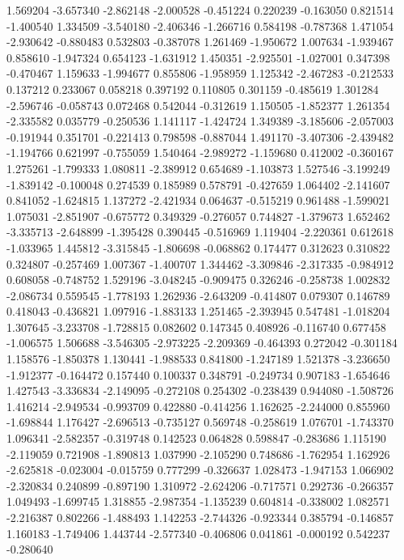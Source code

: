 1.569204
-3.657340
-2.862148
-2.000528
-0.451224
0.220239
-0.163050
0.821514
-1.400540
1.334509
-3.540180
-2.406346
-1.266716
0.584198
-0.787368
1.471054
-2.930642
-0.880483
0.532803
-0.387078
1.261469
-1.950672
1.007634
-1.939467
0.858610
-1.947324
0.654123
-1.631912
1.450351
-2.925501
-1.027001
0.347398
-0.470467
1.159633
-1.994677
0.855806
-1.958959
1.125342
-2.467283
-0.212533
0.137212
0.233067
0.058218
0.397192
0.110805
0.301159
-0.485619
1.301284
-2.596746
-0.058743
0.072468
0.542044
-0.312619
1.150505
-1.852377
1.261354
-2.335582
0.035779
-0.250536
1.141117
-1.424724
1.349389
-3.185606
-2.057003
-0.191944
0.351701
-0.221413
0.798598
-0.887044
1.491170
-3.407306
-2.439482
-1.194766
0.621997
-0.755059
1.540464
-2.989272
-1.159680
0.412002
-0.360167
1.275261
-1.799333
1.080811
-2.389912
0.654689
-1.103873
1.527546
-3.199249
-1.839142
-0.100048
0.274539
0.185989
0.578791
-0.427659
1.064402
-2.141607
0.841052
-1.624815
1.137272
-2.421934
0.064637
-0.515219
0.961488
-1.599021
1.075031
-2.851907
-0.675772
0.349329
-0.276057
0.744827
-1.379673
1.652462
-3.335713
-2.648899
-1.395428
0.390445
-0.516969
1.119404
-2.220361
0.612618
-1.033965
1.445812
-3.315845
-1.806698
-0.068862
0.174477
0.312623
0.310822
0.324807
-0.257469
1.007367
-1.400707
1.344462
-3.309846
-2.317335
-0.984912
0.608058
-0.748752
1.529196
-3.048245
-0.909475
0.326246
-0.258738
1.002832
-2.086734
0.559545
-1.778193
1.262936
-2.643209
-0.414807
0.079307
0.146789
0.418043
-0.436821
1.097916
-1.883133
1.251465
-2.393945
0.547481
-1.018204
1.307645
-3.233708
-1.728815
0.082602
0.147345
0.408926
-0.116740
0.677458
-1.006575
1.506688
-3.546305
-2.973225
-2.209369
-0.464393
0.272042
-0.301184
1.158576
-1.850378
1.130441
-1.988533
0.841800
-1.247189
1.521378
-3.236650
-1.912377
-0.164472
0.157440
0.100337
0.348791
-0.249734
0.907183
-1.654646
1.427543
-3.336834
-2.149095
-0.272108
0.254302
-0.238439
0.944080
-1.508726
1.416214
-2.949534
-0.993709
0.422880
-0.414256
1.162625
-2.244000
0.855960
-1.698844
1.176427
-2.696513
-0.735127
0.569748
-0.258619
1.076701
-1.743370
1.096341
-2.582357
-0.319748
0.142523
0.064828
0.598847
-0.283686
1.115190
-2.119059
0.721908
-1.890813
1.037990
-2.105290
0.748686
-1.762954
1.162926
-2.625818
-0.023004
-0.015759
0.777299
-0.326637
1.028473
-1.947153
1.066902
-2.320834
0.240899
-0.897190
1.310972
-2.624206
-0.717571
0.292736
-0.266357
1.049493
-1.699745
1.318855
-2.987354
-1.135239
0.604814
-0.338002
1.082571
-2.216387
0.802266
-1.488493
1.142253
-2.744326
-0.923344
0.385794
-0.146857
1.160183
-1.749406
1.443744
-2.577340
-0.406806
0.041861
-0.000192
0.542237
-0.280640
